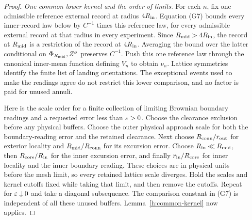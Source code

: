 \begin{proof}
\emph{One common lower kernel and the order of limits.}
For each $n$, fix one admissible reference external record at radius
$4R_{\rm in}$. Equation (G7) bounds every inner-record law below by
$C^{-1}$ times this reference law, for every admissible external record
at that radius in every experiment. Since
$R_{\rm mid}>4R_{\rm in}$, the record at $R_{\rm mid}$ is a
restriction of the record at $4R_{\rm in}$. Averaging the bound over
the latter conditional on $\Phi_{R_{\rm mid}},Z^\sigma$ preserves
$C^{-1}$. Push this one reference law through the canonical inner-mean
function defining $V_n$ to obtain $\nu_n$. Lattice symmetries identify
the finite list of landing orientations. The exceptional events used
to make the readings agree do not restrict this lower comparison, and
no factor is paid for unused annuli.

Here is the scale order for a finite collection of limiting Brownian
boundary readings and a requested error less than $\varepsilon>0$.
Choose the clearance exclusion before any physical buffers. Choose the
outer physical approach scale for both the boundary-reading error and
the retained clearance. Next choose $R_{\rm conn}/r_{\rm out}$
for exterior locality and $R_{\rm mid}/R_{\rm conn}$ for its
excursion error. Choose $R_{\rm in}\ll R_{\rm mid}$, then
$R_{\rm core}/R_{\rm in}$ for the inner excursion error, and finally
$r_{\rm in}/R_{\rm core}$ for inner locality and the inner boundary
reading. These choices are in physical units before the mesh limit, so
every retained lattice scale diverges. Hold the scales and kernel
cutoffs fixed while taking that limit, and then remove the cutoffs.
Repeat for $\varepsilon\downarrow0$ and take a diagonal subsequence.
The comparison constant in (G7) is independent of all these unused buffers.
Lemma~\ref{h:common-kernel} now applies.
\end{proof}

